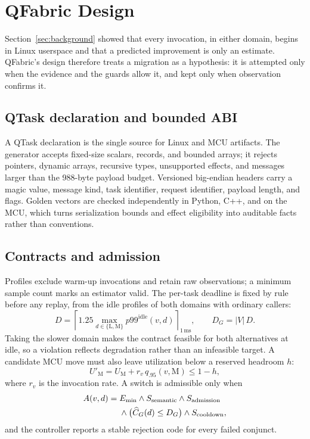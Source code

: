 \documentclass[conference]{IEEEtran}
\newcommand{\system}{QFabric\xspace}
\begin{document}
\section{QFabric Design}
\label{sec:design}
Section~\ref{sec:background} showed that every invocation, in either domain,
begins in Linux userspace and that a predicted improvement is only an
estimate. \system's design therefore treats a migration as a hypothesis: it
is attempted only when the evidence and the guards allow it, and kept only
when observation confirms it.

\subsection{QTask declaration and bounded ABI}
A QTask declaration is the single source for Linux and MCU artifacts. The
generator accepts fixed-size scalars, records, and bounded arrays; it rejects
pointers, dynamic arrays, recursive types, unsupported effects, and messages
larger than the 988-byte payload budget. Versioned big-endian headers carry a
magic value, message kind, task identifier, request identifier, payload
length, and flags. Golden vectors are checked independently in Python, C++,
and on the MCU, which turns serialization bounds and effect eligibility into
auditable facts rather than conventions.

\subsection{Contracts and admission}
Profiles exclude warm-up invocations and retain raw observations; a minimum
sample count marks an estimator valid. The per-task deadline is fixed by rule
before any replay, from the idle profiles of both domains with ordinary
callers:
\begin{equation}
  D=\left\lceil 1.25\max_{d\in\{\mathrm{L},\mathrm{M}\}}
  p99^{\mathrm{idle}}(v,d)\right\rceil_{1\,\mathrm{ms}},\qquad
  D_G=|V|\,D .
  \label{eq:deadline}
\end{equation}
Taking the slower domain makes the contract feasible for both alternatives at
idle, so a violation reflects degradation rather than an infeasible target.
A candidate MCU move must also leave utilization below a reserved headroom $h$:
\begin{equation}
  U'_{\mathrm{M}}=U_{\mathrm{M}}+r_v\,q_{.95}(v,\mathrm{M})\le 1-h,
  \label{eq:admission}
\end{equation}
where $r_v$ is the invocation rate. A switch is admissible only when
\begin{align}
  A(v,d)={}&E_{\min}\land S_{\mathrm{semantic}}\land
  S_{\mathrm{admission}} \notag\\
  &\land \bigl(\widehat{C}_G(d)\le D_G\bigr)\land S_{\mathrm{cooldown}},
  \label{eq:admissible}
\end{align}
and the controller reports a stable rejection code for every failed conjunct.
\end{document}
